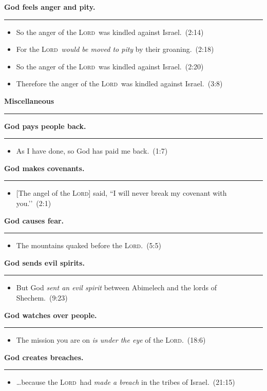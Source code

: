 \documentclass{article}
\newcommand{\godcategory}[1]{\bigskip\noindent \textbf{#1}\smallskip\hrule\nopagebreak}
\newcommand{\Lord}{\textsc{Lord}}
\begin{document}
\begin{landscape}
\begin{multicols}{3}
\godcategory{God feels anger and pity.}
\begin{itemize}
  \item So the anger of the \Lord\ was kindled against Israel.~(2:14)
  \item For the \Lord\ \emph{would be moved to pity} by their groaning.~(2:18)
  \item So the anger of the \Lord\ was kindled against Israel.~(2:20)
  \item Therefore the anger of the \Lord\ was kindled against Israel.~(3:8)
\end{itemize}

\godcategory{Miscellaneous}

\godcategory{God pays people back.}
\begin{itemize}
  \item As I have done, so God has paid me back.~(1:7)
\end{itemize}

\godcategory{God makes covenants.}
\begin{itemize}
  \item {[The angel of the \Lord]} said, ``I will never break my covenant with you.’’~(2:1)
\end{itemize}

\godcategory{God causes fear.}
\begin{itemize}
  \item The mountains quaked before the \Lord.~(5:5)
\end{itemize}

\godcategory{God sends evil spirits.}
\begin{itemize}
  \item But God \emph{sent an evil spirit} between Abimelech and the lords of Shechem.~(9:23)
\end{itemize}

\godcategory{God watches over people.}
\begin{itemize}
  \item The mission you are on \emph{is under the eye} of the \Lord.~(18:6)
\end{itemize}

\godcategory{God creates breaches.}
\begin{itemize}
  \item \ldots because the \Lord\ had \emph{made a breach} in the tribes of Israel.~(21:15)
\end{itemize}


\clearpage


\end{multicols}
\end{landscape}
\end{document}
